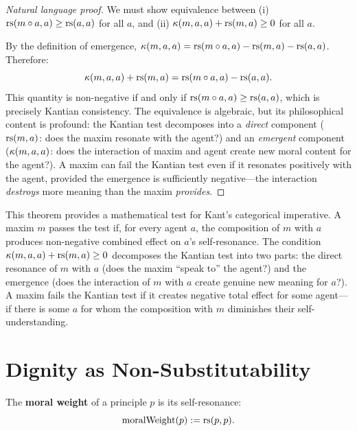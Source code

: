 \begin{proof}[Natural language proof]
We must show equivalence between (i) $\mathrm{rs}(m \circ a, a) \geq \mathrm{rs}(a,a)$
for all $a$, and (ii) $\kappa(m,a,a) + \mathrm{rs}(m,a) \geq 0$ for all $a$.

By the definition of emergence, $\kappa(m,a,a) = \mathrm{rs}(m \circ a, a) -
\mathrm{rs}(m,a) - \mathrm{rs}(a,a)$. Therefore:
\[
  \kappa(m,a,a) + \mathrm{rs}(m,a) = \mathrm{rs}(m \circ a, a) - \mathrm{rs}(a,a).
\]
This quantity is non-negative if and only if $\mathrm{rs}(m \circ a, a) \geq \mathrm{rs}(a,a)$,
which is precisely Kantian consistency. The equivalence is algebraic, but its
philosophical content is profound: the Kantian test decomposes into a
\emph{direct} component ($\mathrm{rs}(m,a)$: does the maxim resonate with the agent?)
and an \emph{emergent} component ($\kappa(m,a,a)$: does the interaction of
maxim and agent create new moral content for the agent?). A maxim can fail the
Kantian test even if it resonates positively with the agent, provided the
emergence is sufficiently negative---the interaction \emph{destroys} more
meaning than the maxim \emph{provides}.
\end{proof}

\begin{interpretation}
This theorem provides a mathematical test for Kant's categorical imperative. A
maxim $m$ passes the test if, for every agent $a$, the composition of $m$ with
$a$ produces non-negative combined effect on $a$'s self-resonance. The condition
$\kappa(m,a,a) + \mathrm{rs}(m,a) \geq 0$ decomposes the Kantian test into two parts:
the direct resonance of $m$ with $a$ (does the maxim ``speak to'' the agent?)
and the emergence (does the interaction of $m$ with $a$ create genuine new
meaning for $a$?). A maxim fails the Kantian test if it creates negative
total effect for some agent---if there is some $a$ for whom the composition
with $m$ diminishes their self-understanding.
\end{interpretation}

\section{Dignity as Non-Substitutability}

\begin{definition}
\label{def:moral-weight}
The \textbf{moral weight} of a principle $p$ is its self-resonance:
\[
  \mathrm{moralWeight}(p) := \mathrm{rs}(p, p).
\]
\end{definition}

